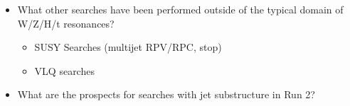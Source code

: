 \label{othersearches}

\begin{itemize}
\item What other searches have been performed outside of the typical domain of W/Z/H/t resonances?
\begin{itemize}
 	\item SUSY Searches (multijet RPV/RPC, stop)
 	\item VLQ searches
 \end{itemize} 
\item What are the prospects for searches with jet substructure in Run 2?
\end{itemize}